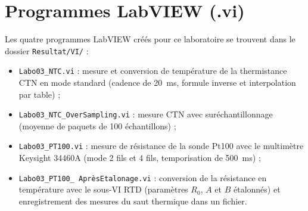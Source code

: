 \chapter{Programmes LabVIEW (.vi)}
\label{app:labview}

Les quatre programmes LabVIEW créés pour ce laboratoire se trouvent dans le dossier \texttt{Resultat/VI/} :

\begin{itemize}[leftmargin=1.2cm]
    \item \texttt{Labo03\_NTC.vi} : mesure et conversion de température de la thermistance CTN en mode standard (cadence de \qty{20}{\milli\second}, formule inverse et interpolation par table) ;
    \item \texttt{Labo03\_NTC\_OverSampling.vi} : mesure CTN avec suréchantillonnage (moyenne de paquets de 100 échantillons) ;
    \item \texttt{Labo03\_PT100.vi} : mesure de résistance de la sonde Pt100 avec le multimètre Keysight 34460A (mode 2 fils et 4 fils, temporisation de \qty{500}{\milli\second}) ;
    \item \texttt{Labo03\_PT100\_\ AprèsEtalonage.vi} : conversion de la résistance en température avec le sous-VI RTD (paramètres $R_0$, $A$ et $B$ étalonnés) et enregistrement des mesures du saut thermique dans un fichier.
\end{itemize}
